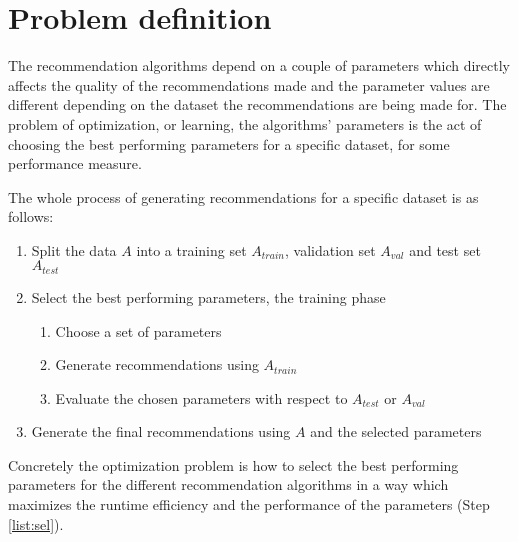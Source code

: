 
\newpage
\section{Problem definition}\label{sec:intro:prob}

The recommendation algorithms depend on a couple of parameters which directly affects the quality of the recommendations made and the parameter values are different depending on the dataset the recommendations are being made for. The problem of optimization, or learning, the algorithms' parameters is the act of choosing the best performing parameters for a specific dataset, for some performance measure.

The whole process of generating recommendations for a specific dataset is as follows:

\begin{enumerate}
    \item Split the data $A$ into a training set $A_{train}$, validation set $A_{val}$ and test set $A_{test}$
    \item \label{list:sel} Select the best performing parameters, the training phase
        \begin{enumerate}
            \item \label{list:choose} Choose a set of parameters
            \item Generate recommendations using $A_{train}$
            \item Evaluate the chosen parameters with respect to $A_{test}$ or $A_{val}$
        \end{enumerate}
    \item Generate the final recommendations using $A$ and the selected parameters
\end{enumerate}

Concretely the optimization problem is how to select the best performing parameters for the different recommendation algorithms in a way which maximizes the runtime efficiency and the performance of the parameters (Step \ref{list:sel}).

